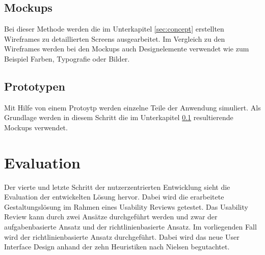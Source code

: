 \subsection{Mockups}\label{sec:mockup}

Bei dieser Methode werden die im Unterkapitel \ref{sec:concept} erstellten Wireframes zu detaillierten Screens ausgearbeitet.
Im Vergleich zu den Wireframes werden bei den Mockups auch Designelemente verwendet wie zum Beispiel Farben, Typografie oder Bilder.

\subsection{Prototypen}

Mit Hilfe von einem Protoytp werden einzelne Teile der Anwendung simuliert.
Als Grundlage werden in diesem Schritt die im Unterkapitel \ref{sec:mockup} resultierende Mockups verwendet.

\section{Evaluation}

Der vierte und letzte Schritt der nutzerzentrierten Entwicklung sieht die Evaluation der entwickelten Lösung hervor.
Dabei wird die erarbeitete Gestaltungslösung im Rahmen eines Usability Reviews getestet.
Das Usability Review kann durch zwei Ansätze durchgeführt werden und zwar der aufgabenbasierte Ansatz und der richtlinienbasierte Ansatz.
Im vorliegenden Fall wird der richtlinienbasierte Ansatz durchgeführt.
Dabei wird das neue User Interface Design anhand der zehn Heuristiken nach Nielsen begutachtet.



